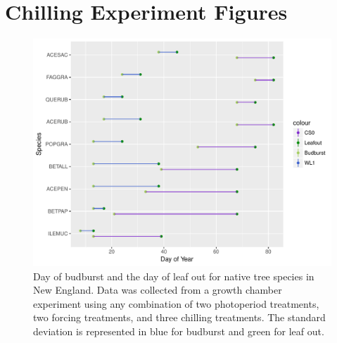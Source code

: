 \documentclass{article}\usepackage[]{graphicx}\usepackage[]{color}
\begin{document}
\renewcommand{\thetable}{\arabic{table}}
\renewcommand{\thefigure}{\arabic{figure}}
\renewcommand{\labelitemi}{$-$}
\section*{Chilling Experiment Figures}

\begin{figure} [H]
\begin{center}
\caption{Day of budburst and the day of leaf out for native tree species in New England. Data was collected from a growth chamber experiment using any combination of two photoperiod treatments, two forcing treatments, and three chilling treatments. The standard deviation is represented in blue for budburst and green for leaf out. }
\includegraphics{..//figure/Exp_plot.pdf} 
\end{center}
\end{figure}
\end{document}
